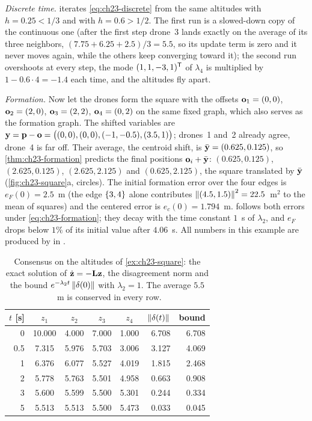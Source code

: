 \begin{example}
\emph{Discrete time.}  iterates
\cref{eq:ch23-discrete} from the same altitudes with $h = 0.25 < 1/3$ and
with $h = 0.6 > 1/2$. The first run is a slowed-down copy of the continuous
one (after the first step drone~3 lands exactly on the average of its three
neighbors, $(7.75 + 6.25 + 2.5)/3 = 5.5$, so its update term is zero and it
never moves again, while the others keep converging toward it); the second run
overshoots at every step, the mode $(1, 1, -3, 1)^{\mathsf{T}}$ of $\lambda_4$ is
multiplied by $1 - 0.6 \cdot 4 = -1.4$ each time, and the altitudes fly apart.

\emph{Formation.} Now let the drones form the square with the offsets
$\mathbf{o}_1 = (0, 0)$, $\mathbf{o}_2 = (2, 0)$, $\mathbf{o}_3 = (2, 2)$,
$\mathbf{o}_4 = (0, 2)$ on the same fixed graph, which also serves as the
formation graph. The shifted variables are $\mathbf{y} = \mathbf{p} - \mathbf{o} =
\bigl((0,0), (0,0), (-1, -0.5), (3.5, 1)\bigr)$; drones~1 and~2 already agree,
drone~4 is far off. Their average, the centroid shift, is
$\bar{\mathbf{y}} = (0.625, 0.125)$, so \cref{thm:ch23-formation} predicts the
final positions $\mathbf{o}_i + \bar{\mathbf{y}}$: $(0.625, 0.125)$,
$(2.625, 0.125)$, $(2.625, 2.125)$ and $(0.625, 2.125)$, the square translated by
$\bar{\mathbf{y}}$ (\cref{fig:ch23-square}a, circles). The initial formation error
over the four edges is $e_F(0) = 2.5$~m (the edge $\left\{ 3,4 \right\}$ alone contributes
$\left\lVert (4.5, 1.5) \right\rVert^2 = 22.5$~m$^2$ to the mean of squares) and the centered error
is $e_c(0) = 1.794$~m.  follows both errors under
\cref{eq:ch23-formation}; they decay with the time constant $1$~s of
$\lambda_2$, and $e_F$ drops below $1\%$ of its initial value after $4.06$~s.
All numbers in this example are produced by  in
.
\end{example}

\begin{table}[tb]
  \centering\small
  \caption{Consensus on the altitudes of \cref{ex:ch23-square}: the exact
  solution of $\dot{\mathbf{z}} = -\mathbf{L}\mathbf{z}$, the disagreement norm and
  the bound $e^{-\lambda_2 t}\left\lVert \mathbf{\delta}(0) \right\rVert$ with $\lambda_2 = 1$. The
  average $5.5$~m is conserved in every row.}
  \label{tab:ch23-consensus}
  \begin{tabular}{@{}rccccrr@{}}
  \toprule
  $t$ [s] & $z_1$ & $z_2$ & $z_3$ & $z_4$ & $\left\lVert \mathbf{\delta}(t) \right\rVert$ & bound\\
  \midrule
  0   & 10.000 & 4.000 & 7.000 & 1.000 & 6.708 & 6.708\\
  0.5 & 7.315 & 5.976 & 5.703 & 3.006 & 3.127 & 4.069\\
  1   & 6.376 & 6.077 & 5.527 & 4.019 & 1.815 & 2.468\\
  2   & 5.778 & 5.763 & 5.501 & 4.958 & 0.663 & 0.908\\
  3   & 5.600 & 5.599 & 5.500 & 5.301 & 0.244 & 0.334\\
  5   & 5.513 & 5.513 & 5.500 & 5.473 & 0.033 & 0.045\\
  \bottomrule
  \end{tabular}
\end{table}

